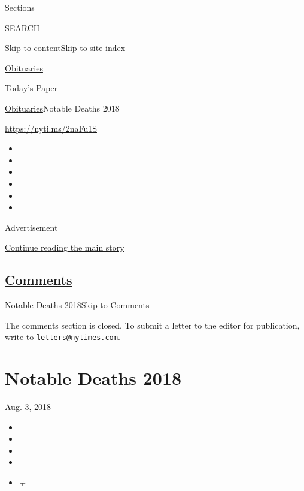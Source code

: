 Sections

SEARCH

\protect\hyperlink{site-content}{Skip to
content}\protect\hyperlink{site-index}{Skip to site index}

\href{https://www.nytimes.com/section/obituaries}{Obituaries}

\href{https://myaccount.nytimes.com/auth/login?response_type=cookie\&client_id=vi}{}

\href{https://www.nytimes.com/section/todayspaper}{Today's Paper}

\href{/section/obituaries}{Obituaries}\textbar{}Notable Deaths 2018

\url{https://nyti.ms/2naFu1S}

\begin{itemize}
\item
\item
\item
\item
\item
\item
\end{itemize}

Advertisement

\protect\hyperlink{after-top}{Continue reading the main story}

\hypertarget{comments}{%
\subsection{\texorpdfstring{\protect\hyperlink{commentsContainer}{Comments}}{Comments}}\label{comments}}

\href{}{Notable Deaths 2018}\href{}{Skip to Comments}

The comments section is closed. To submit a letter to the editor for
publication, write to
\href{mailto:letters@nytimes.com}{\nolinkurl{letters@nytimes.com}}.

\hypertarget{notable-deaths-2018}{%
\section{Notable Deaths 2018}\label{notable-deaths-2018}}

Aug. 3, 2018

\begin{itemize}
\item
\item
\item
\item
\item
  \emph{+}
\end{itemize}


